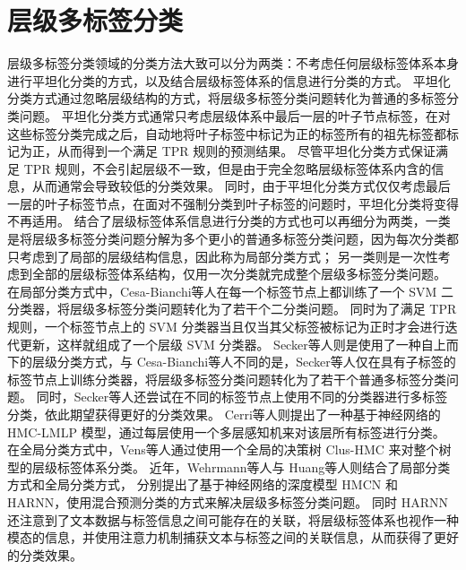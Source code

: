 \section{层级多标签分类}
    层级多标签分类领域的分类方法大致可以分为两类：不考虑任何层级标签体系本身进行平坦化分类的方式，以及结合层级标签体系的信息进行分类的方式。
    平坦化分类方式通过忽略层级结构的方式，将层级多标签分类问题转化为普通的多标签分类问题。
    平坦化分类方式通常只考虑层级体系中最后一层的叶子节点标签，在对这些标签分类完成之后，自动地将叶子标签中标记为正的标签所有的祖先标签都标记为正，从而得到一个满足 TPR 规则的预测结果。
    尽管平坦化分类方式保证满足 TPR 规则，不会引起层级不一致，但是由于完全忽略层级标签体系内含的信息，从而通常会导致较低的分类效果。
    同时，由于平坦化分类方式仅仅考虑最后一层的叶子标签节点，在面对不强制分类到叶子标签的问题时，平坦化分类将变得不再适用\cite{Silla2010ASO}。
    结合了层级标签体系信息进行分类的方式也可以再细分为两类，一类是将层级多标签分类问题分解为多个更小的普通多标签分类问题，因为每次分类都只考虑到了局部的层级结构信息，因此称为局部分类方式；
    另一类则是一次性考虑到全部的层级标签体系结构，仅用一次分类就完成整个层级多标签分类问题。
    在局部分类方式中，Cesa-Bianchi等人\cite{CesaBianchi2004IncrementalAF}在每一个标签节点上都训练了一个 SVM 二分类器，将层级多标签分类问题转化为了若干个二分类问题。
    同时为了满足 TPR 规则，一个标签节点上的 SVM 分类器当且仅当其父标签被标记为正时才会进行迭代更新，这样就组成了一个层级 SVM 分类器。
    Secker等人\cite{Secker2007AnEC}则是使用了一种自上而下的层级分类方式，与 Cesa-Bianchi等人不同的是，Secker等人仅在具有子标签的标签节点上训练分类器，将层级多标签分类问题转化为了若干个普通多标签分类问题。
    同时，Secker等人还尝试在不同的标签节点上使用不同的分类器进行多标签分类，依此期望获得更好的分类效果。
    Cerri等人\cite{Cerri2016ReductionSF}则提出了一种基于神经网络的 HMC-LMLP 模型，通过每层使用一个多层感知机来对该层所有标签进行分类。
    在全局分类方式中，Vens等人\cite{Vens2008DecisionTF}通过使用一个全局的决策树 Clus-HMC 来对整个树型的层级标签体系分类。
    近年，Wehrmann等人\cite{Wehrmann2018HierarchicalMC}与 Huang等人\cite{Huang2019HierarchicalMT}则结合了局部分类方式和全局分类方式，
    分别提出了基于神经网络的深度模型 HMCN 和 HARNN，使用混合预测分类的方式来解决层级多标签分类问题。
    同时 HARNN 还注意到了文本数据与标签信息之间可能存在的关联，将层级标签体系也视作一种模态的信息，并使用注意力机制捕获文本与标签之间的关联信息，从而获得了更好的分类效果。
